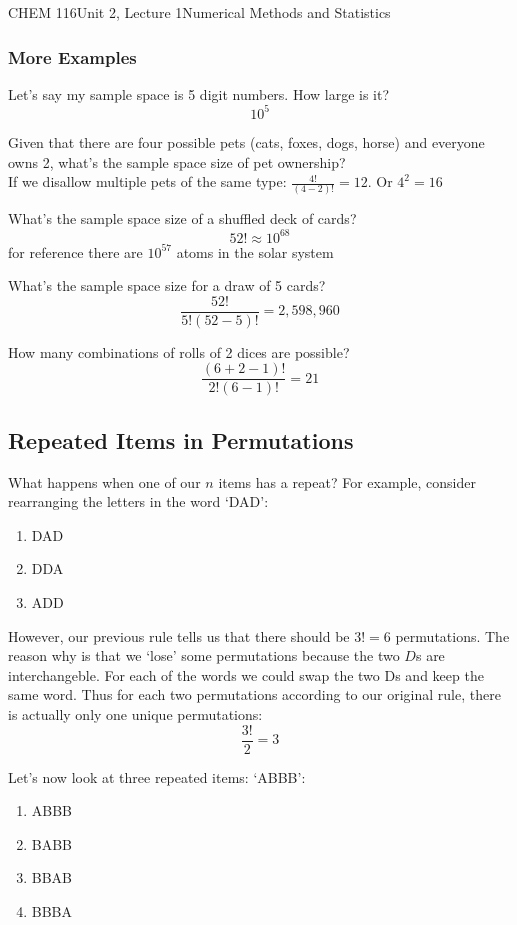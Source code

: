 \documentclass{article}
\begin{document}
\begin{tdoc}{CHEM 116}{Unit 2, Lecture 1}{Numerical Methods and Statistics}
  \subsubsection{More Examples}

  Let's say my sample space is 5 digit numbers. How large is it?\\
  $$10^5$$

  Given that there are four possible pets (cats, foxes, dogs, horse)
  and everyone owns 2, what's the sample space size of pet
  ownership?\\ If we disallow multiple pets of the same type:
  $\frac{4!}{(4 - 2)!} = 12$. Or $4^2 = 16$

  What's the sample space size of a shuffled deck of cards?\\
  $$52! \approx 10^{68}$$
  for reference there are $10^{57}$ atoms in the solar system

  What's the sample space size for a draw of 5 cards?\\
  $$\frac{52!}{5!(52 - 5)!} = 2,598,960$$

  How many combinations of rolls of 2 dices are possible?\\
  $$\frac{(6 + 2 - 1)!}{2!(6 - 1)!} = 21$$

\subsection{Repeated Items in Permutations}

What happens when one of our $n$ items has a repeat? For example, consider rearranging
the letters in the word `DAD':

\begin{enumerate}
\item DAD
\item DDA
\item ADD
\end{enumerate}

However, our previous rule tells us that there should be $3! = 6$ permutations. The reason why is that we `lose' some permutations because
the two $D$s are interchangeble. For each of the words we could swap the two Ds and keep the same word. Thus for each two permutations according
to our original rule, there is actually only one unique permutations:  $$ \frac{3!}{2} = 3$$

Let's now look at three repeated items: `ABBB':
\begin{enumerate}
\item ABBB
\item BABB
\item BBAB
\item BBBA
\end{enumerate}


\end{tdoc}
\end{document}
